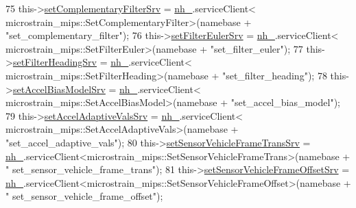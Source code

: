 \begin{DoxyCode}
75                 this->\hyperlink{classcl__microstrain__mips_1_1ClMicrostainMips_a54045931a06f909418ac284235c5dd5a}{setComplementaryFilterSrv} = \hyperlink{classcl__microstrain__mips_1_1ClMicrostainMips_a5a39ba0864ba2c4c003b6ea427538243}{nh\_}.serviceClient<
      microstrain\_mips::SetComplementaryFilter>(namebase + \textcolor{stringliteral}{"set\_complementary\_filter"});
76                 this->\hyperlink{classcl__microstrain__mips_1_1ClMicrostainMips_a4e88ebd03c7a774e958f8902c18e7f69}{setFilterEulerSrv} = \hyperlink{classcl__microstrain__mips_1_1ClMicrostainMips_a5a39ba0864ba2c4c003b6ea427538243}{nh\_}.serviceClient<
      microstrain\_mips::SetFilterEuler>(namebase + \textcolor{stringliteral}{"set\_filter\_euler"});
77                 this->\hyperlink{classcl__microstrain__mips_1_1ClMicrostainMips_abe64faba505dfdab0b78b7cf31f9609d}{setFilterHeadingSrv} = \hyperlink{classcl__microstrain__mips_1_1ClMicrostainMips_a5a39ba0864ba2c4c003b6ea427538243}{nh\_}.serviceClient<
      microstrain\_mips::SetFilterHeading>(namebase + \textcolor{stringliteral}{"set\_filter\_heading"});
78                 this->\hyperlink{classcl__microstrain__mips_1_1ClMicrostainMips_a8d7c0f0a94dd6a25cac0130f8d9f55ff}{setAccelBiasModelSrv} = \hyperlink{classcl__microstrain__mips_1_1ClMicrostainMips_a5a39ba0864ba2c4c003b6ea427538243}{nh\_}.serviceClient<
      microstrain\_mips::SetAccelBiasModel>(namebase + \textcolor{stringliteral}{"set\_accel\_bias\_model"});
79                 this->\hyperlink{classcl__microstrain__mips_1_1ClMicrostainMips_a0e22727b68e51261aa65605f236419e6}{setAccelAdaptiveValsSrv} = \hyperlink{classcl__microstrain__mips_1_1ClMicrostainMips_a5a39ba0864ba2c4c003b6ea427538243}{nh\_}.serviceClient<
      microstrain\_mips::SetAccelAdaptiveVals>(namebase + \textcolor{stringliteral}{"set\_accel\_adaptive\_vals"});
80                 this->\hyperlink{classcl__microstrain__mips_1_1ClMicrostainMips_ac020b44e78addaa26beb44081d99f194}{setSensorVehicleFrameTransSrv} = 
      \hyperlink{classcl__microstrain__mips_1_1ClMicrostainMips_a5a39ba0864ba2c4c003b6ea427538243}{nh\_}.serviceClient<microstrain\_mips::SetSensorVehicleFrameTrans>(namebase + \textcolor{stringliteral}{"
      set\_sensor\_vehicle\_frame\_trans"});
81                 this->\hyperlink{classcl__microstrain__mips_1_1ClMicrostainMips_a977cce1917e12d96f614266baa4ae55d}{setSensorVehicleFrameOffsetSrv} = 
      \hyperlink{classcl__microstrain__mips_1_1ClMicrostainMips_a5a39ba0864ba2c4c003b6ea427538243}{nh\_}.serviceClient<microstrain\_mips::SetSensorVehicleFrameOffset>(namebase + \textcolor{stringliteral}{"
      set\_sensor\_vehicle\_frame\_offset"});

\end{DoxyCode}
